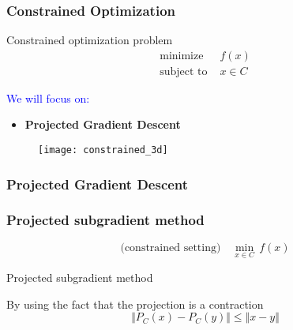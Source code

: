 \documentclass{beamer}
\begin{document}
\begin{frame}
  \frametitle{Constrained Optimization}

  \begin{minipage}{0.5\textwidth}
    \begin{block}{Constrained optimization problem}
      \begin{equation}
        \begin{aligned}
          \text{minimize} & f(x)\\
          \text{subject to } & x\in C
        \end{aligned}
      \end{equation}
      \end{block}
      \textcolor{blue}{We will focus on:}
      \begin{itemize}
        \item \textbf{Projected Gradient Descent}
      \end{itemize}
  \end{minipage}
  \begin{minipage}{0.45\textwidth}
    \begin{figure}[ht]
      \centering
      \texttt{[image: constrained\_3d]}
    \end{figure}
  \end{minipage}
\end{frame}


\begin{frame}
  \frametitle{Projected Gradient Descent}



\end{frame}


\begin{frame}
  \frametitle{Projected subgradient method}
  \begin{equation}
    \text{(constrained setting)} \quad \min_{x\in C}\, f(x)
  \end{equation}
  \begin{algorithm}[H]
    \caption{Projected subgradient method}\label{label:}
    \begin{algorithmic}[1]
      \EndFor
    \end{algorithmic}
  \end{algorithm}
  By using the fact that the projection is a contraction
  \begin{equation}
    \Vert P_C(x) - P_C(y) \Vert \le \Vert x-y \Vert
  \end{equation}
\end{frame}
\end{document}

